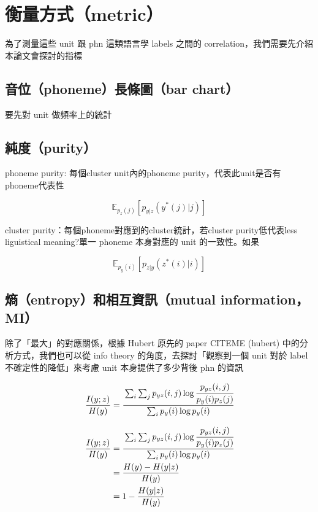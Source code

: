 \section{衡量方式（metric）}

為了測量這些 unit 跟 phn 這類語言學 labels 之間的 correlation，我們需要先介紹本論文會探討的指標

\subsection{音位（phoneme）長條圖（bar chart）}

要先對 unit 做頻率上的統計

\subsection{純度（purity）}


phoneme purity: 每個cluster unit內的phoneme purity，代表此unit是否有phoneme代表性

\newcommand{\E}{\mathbb{E}}

$$\E_{p_z(j)}\left[p_{y|z}(y^*(j)|j) \right]$$

cluster purity：每個phoneme對應到的cluster統計，若cluster purity低代表less liguistical meaning?單一 phoneme 本身對應的 unit 的一致性。如果

$$\E_{p_y(i)}\left[p_{z|y}(z^*(i)|i) \right]$$

\subsection{熵（entropy）和相互資訊（mutual information，MI）}

除了「最大」的對應關係，根據 Hubert 原先的 paper CITEME (hubert) 中的分析方式，我們也可以從 info theory 的角度，去探討「觀察到一個 unit 對於 label 不確定性的降低」來考慮 unit 本身提供了多少背後 phn 的資訊

$$\frac{I(y;z)}{H(y)}=\cfrac{\sum_i \sum_j p_{yz}(i, j) \log \cfrac{p_{yz}(i, j)}{p_y(i)p_z(j)}}{\sum_i p_y(i) \log p_y(i)}$$

\begin{align}
\frac{I(y;z)}{H(y)}&=\cfrac{\sum_i \sum_j p_{yz}(i, j) \log \cfrac{p_{yz}(i, j)}{p_y(i)p_z(j)}}{\sum_i p_y(i) \log p_y(i)} \\
&=\frac{H(y)-H(y|z)}{H(y)} \\
&=1-\frac{H(y|z)}{H(y)}
\end{align}



